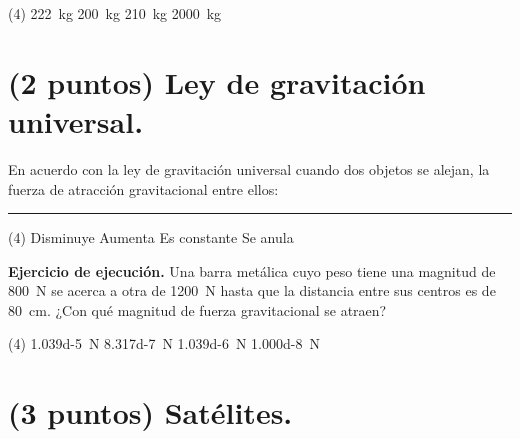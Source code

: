 \documentclass[12pt, letter]{exam}
\begin{document}
\begin{questions}
    \begin{tasks}(4)
        \task \SI{222}{\kilo\gram}
        \task \SI{200}{\kilo\gram}
        \task \SI{210}{\kilo\gram}
        \task \SI{2000}{\kilo\gram}
    \end{tasks}

    \section{(2 puntos) Ley de gravitación universal.}

    \question En acuerdo con la ley de gravitación universal cuando dos objetos se alejan, la fuerza de atracción gravitacional entre ellos: \rule{2cm}{0.1mm}
    \begin{tasks}(4)
        \task Disminuye
        \task Aumenta
        \task Es constante
        \task Se anula
    \end{tasks}
    \question \label{Ejercicio_10} \textbf{Ejercicio de ejecución. } Una barra metálica cuyo peso tiene una magnitud de \SI{800}{\newton} se acerca a otra de \SI{1200}{\newton} hasta que la distancia entre sus centros es de \SI{80}{\centi\meter}. ¿Con qué magnitud de fuerza gravitacional se atraen?
    \begin{tasks}(4)
        \task \SI{1.039d-5}{\newton}
        \task \SI{8.317d-7}{\newton}
        \task \SI{1.039d-6}{\newton}
        \task \SI{1.000d-8}{\newton}
    \end{tasks}

    \section{(3 puntos) Satélites.}


\end{questions}
\end{document}
